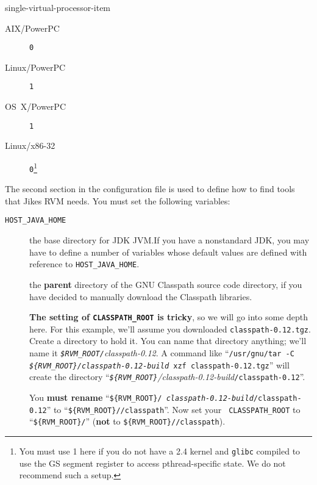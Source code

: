\begin{enumerate}
\begin{Label}{single-virtual-processor-item}
\begin{description}
\item[AIX/PowerPC] \texttt{0 }
\item[Linux/PowerPC] \texttt{1}
\item[OS~X/PowerPC] \texttt{1}
\item[Linux/x86-32] \texttt{0}\footnote{You must use 1 here if you do not
have a 2.4 kernel and \texttt{glibc} compiled to use the GS segment register to
access pthread-specific state.  We do not recommend such a setup.}
\end{description}                
\end{Label}

The second section in the configuration file is used to define how to
find tools that Jikes RVM needs. You must set the following variables:

\begin{description}

\item[\texttt{HOST\_JAVA\_HOME}] the base directory for JDK JVM.\@  If you
have a nonstandard JDK, you may have to define a number of variables
whose default values are defined with reference to \texttt{HOST\_JAVA\_HOME}.

\label{manual-classpath-root}%
\item[] the {\bf parent} directory of the GNU
  Classpath source code directory, if you have decided to manually
  download the Classpath libraries. 

{\bf The setting of \texttt{CLASSPATH\_ROOT} is tricky}, so we will go
into some depth here.  For this example, we'll assume you downloaded
\texttt{classpath-0.12.tgz}.  Create a directory to hold it.  You can
name that directory anything; we'll name it 
{\it \texttt{\$RVM\_\-ROOT/}classpath-0.12}.  
A command like 
``\texttt{/usr/gnu/tar -C
  {\rm \it \texttt{\$\{RVM\_\-ROOT\}/}\-classpath-0.12-build} xzf classpath-0.12.tgz}''
will create the directory
``{\rm \it \texttt{\$\{RVM\_\-ROOT\}}/\-class\-path-0.12-build}\texttt{/\-class\-path-0.12}''.  

You {\bf must rename} ``\texttt{\$\{RVM\_\-ROOT\}/{\it
    class\-path-0.12-build}/\-class\-path-0.12}'' to ``\texttt{\$\{RVM\_\-ROOT\}//\-class\-path}''.  Now set your {\tt
  CLASS\-PATH\_\-ROOT} to ``\texttt{\$\{RVM\_\-ROOT\}/}''
({\bf not} to \texttt{\$\{RVM\_\-ROOT\}//\-class\-path}).



\end{description}
\end{enumerate}
